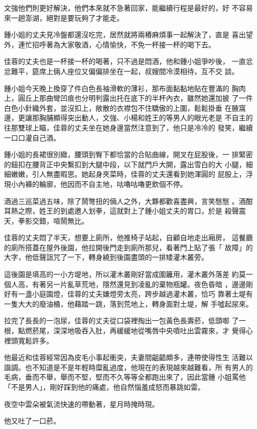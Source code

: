 文強他們則更好解決，他們本來就不急著回家，能繼續行程是最好的，好
不容易來一趟澎湖，絕對是要玩夠了才能走。

鍾小姐的丈夫見冷盤都還沒吃完，居然就將兩樁麻煩事一起解決了，直是
喜出望外，連忙招呼著為大家敬酒，心情愉快，不免一杯接一杯的喝下去。

佳蓉的丈夫也是一杯接一杯的喝著，只不過是悶酒，他和鍾小姐爭吵後，
一直忿忿難平，筵席上倆人座位又偏偏排坐在一起，叔嫂間冷漠相待，互不交
談。

鍾小姐今天晚上換穿了件白色長袖滑軟的薄衫，那布面黏黏地貼在豐滿的
胸肉上，圓丘上那曲彎凹痕也分明判露出托在底下的半杯內衣，雖然她還加披
了一件白色小針織外套，並沒扣上，敞散的衣襟包不住驕傲的上圍，鬆鬆掛垂
在腋窩邊，更讓那胸脯顯得突出動人，文強、小楊和姓王的等男人的眼光老是
不自主的往那雙球上瞄，佳蓉的丈夫坐在她身邊當然注意到了，他只是冷冷的
發笑，繼續一口口灌自己酒。

鍾小姐的長裙很別緻，腰頭到臀下都恰當的合貼曲線，開叉在屁股後，一
排緊密的鈕扣在腰背正中央繫扣到大腿中段，以下就門戶大開，露出雪白的大
小腿，細細嫩嫩，引人無盡暇思。她起身夾菜時，佳蓉的丈夫還看到她渾圓的
屁股上，浮現小內褲的輪廓，他因而不自主地，咕嚕咕嚕更飲個不停。

酒過三巡菜過五味，除了鬧彆扭的倆人之外，大夥都歡喜盡興，言笑慇慇
。酒酣耳熱之際，姓王的到處邀人划拳，這就對上了鍾小姐丈夫的胃口，於是
殺聲震天，拳影交錯，喧鬧無比。

佳蓉的丈夫悶了半天，想要上廁所，他推椅子站起，自顧自地走出廂房，
這餐廳的廁所搭蓋在屋外後園，他拉開後門走到廁所那兒，看著門上貼了張「
故障」的大字，他低聲詛咒了一下，轉身繞到後園盡頭的一排矮灌木叢旁。

這後園是填高的一小方堤地，所以灌木叢剛好當成圍籬用，灌木叢外落差
約莫一個人高，有著另一片亂草荒地，隱然還見到凌亂的棄物瓶罐。夜色昏暗
，邊邊剛好有一盞小庭園燈，佳蓉的丈夫嫌燈旁太亮，跨步越過灌木叢，恰巧
靠著土堤有一隻大大的廢油桶，他藉踏一跳，落到荒地上，轉身面對土堤，解
手噓起尿來。

拉完了長長的一泡尿，佳蓉的丈夫從口袋裡掏出一包黃色長壽菸，低頭啣
了一根，點燃菸尾，深深地吸吞入肚，再緩緩地從嘴唇中央噴吐出雲霧來，才
覺得心裡頭寬鬆許多。

他最近和佳蓉經常因為皮毛小事起衝突，夫妻間齟齬頗多，連帶使得性生
活難以諧調。也不知道是不是年輕時糜亂過度，他現在的表現越來越難看，所
有男人的毛病，垂而不舉，舉而不堅，堅而不久等等全都跑出來了，因此當鍾
小姐罵他「不是男人」，剛好踩到他的痛處，他自然惱羞成怒而暴跳如雷。

夜空中雲朵被氣流快速的帶動著，星月時掩時現。

他又吐了一口菸。

